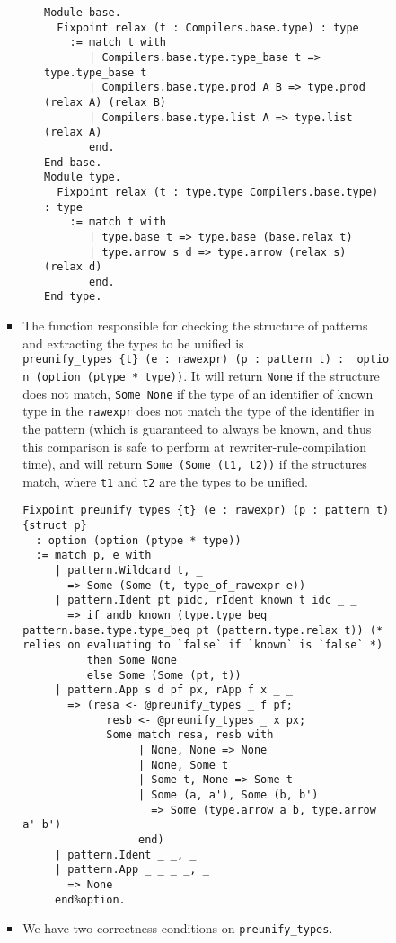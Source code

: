 \documentclass[
]{article}
\begin{document}
\begin{itemize}
\begin{itemize}
\begin{itemize}
\begin{itemize}
\begin{itemize}
\begin{verbatim}
Module base.
  Fixpoint relax (t : Compilers.base.type) : type
    := match t with
       | Compilers.base.type.type_base t => type.type_base t
       | Compilers.base.type.prod A B => type.prod (relax A) (relax B)
       | Compilers.base.type.list A => type.list (relax A)
       end.
End base.
Module type.
  Fixpoint relax (t : type.type Compilers.base.type) : type
    := match t with
       | type.base t => type.base (base.relax t)
       | type.arrow s d => type.arrow (relax s) (relax d)
       end.
End type.
\end{verbatim}
        \end{itemize}
      \item
        The function responsible for checking the structure of patterns
        and extracting the types to be unified is
        \texttt{preunify\_types\ \{t\}\ (e\ :\ rawexpr)\ (p\ :\ pattern\ t)\ :\ \ option\ (option\ (ptype\ *\ type))}.
        It will return \texttt{None} if the structure does not match,
        \texttt{Some\ None} if the type of an identifier of known type
        in the \texttt{rawexpr} does not match the type of the
        identifier in the pattern (which is guaranteed to always be
        known, and thus this comparison is safe to perform at
        rewriter-rule-compilation time), and will return
        \texttt{Some\ (Some\ (t1,\ t2))} if the structures match, where
        \texttt{t1} and \texttt{t2} are the types to be unified.

\begin{verbatim}
Fixpoint preunify_types {t} (e : rawexpr) (p : pattern t) {struct p}
  : option (option (ptype * type))
  := match p, e with
     | pattern.Wildcard t, _
       => Some (Some (t, type_of_rawexpr e))
     | pattern.Ident pt pidc, rIdent known t idc _ _
       => if andb known (type.type_beq _ pattern.base.type.type_beq pt (pattern.type.relax t)) (* relies on evaluating to `false` if `known` is `false` *)
          then Some None
          else Some (Some (pt, t))
     | pattern.App s d pf px, rApp f x _ _
       => (resa <- @preunify_types _ f pf;
             resb <- @preunify_types _ x px;
             Some match resa, resb with
                  | None, None => None
                  | None, Some t
                  | Some t, None => Some t
                  | Some (a, a'), Some (b, b')
                    => Some (type.arrow a b, type.arrow a' b')
                  end)
     | pattern.Ident _ _, _
     | pattern.App _ _ _ _, _
       => None
     end%option.
\end{verbatim}
      \item
        We have two correctness conditions on \texttt{preunify\_types}.


\end{itemize}
\end{itemize}
\end{itemize}
\end{itemize}
\end{document}
